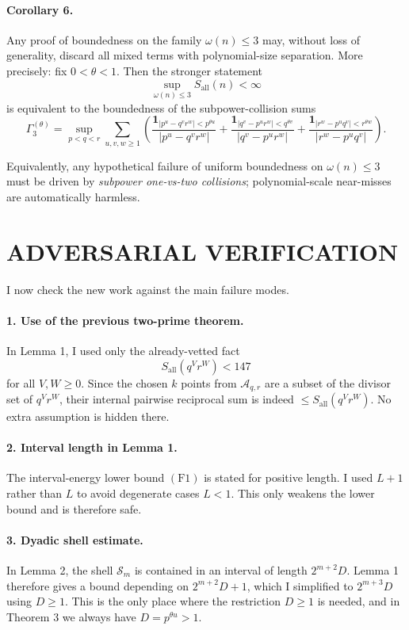 \paragraph{Corollary 6.}
Any proof of boundedness on the family \(\omega(n)\le 3\) may, without loss of generality, discard all mixed terms with polynomial-size separation. More precisely: fix \(0<\theta<1\). Then the stronger statement
\[
\sup_{\omega(n)\le 3}S_{\mathrm{all}}(n)<\infty
\]
is equivalent to the boundedness of the subpower-collision sums
\[
\Gamma_3^{(\theta)}
=
\sup_{p<q<r}
\sum_{u,v,w\ge 1}
\left(
\frac{\mathbf 1_{|p^u-q^v r^w|<p^{\theta u}}}{|p^u-q^v r^w|}
+
\frac{\mathbf 1_{|q^v-p^u r^w|<q^{\theta v}}}{|q^v-p^u r^w|}
+
\frac{\mathbf 1_{|r^w-p^u q^v|<r^{\theta w}}}{|r^w-p^u q^v|}
\right).
\]

Equivalently, any hypothetical failure of uniform boundedness on \(\omega(n)\le 3\) must be driven by \emph{subpower one-vs-two collisions}; polynomial-scale near-misses are automatically harmless.

\section{ADVERSARIAL VERIFICATION}

I now check the new work against the main failure modes.

\paragraph{1. Use of the previous two-prime theorem.}
In Lemma 1, I used only the already-vetted fact
\[
S_{\mathrm{all}}(q^V r^W)<147
\]
for all \(V,W\ge 0\). Since the chosen \(k\) points from \(\mathcal A_{q,r}\) are a subset of the divisor set of \(q^V r^W\), their internal pairwise reciprocal sum is indeed \(\le S_{\mathrm{all}}(q^V r^W)\). No extra assumption is hidden there.

\paragraph{2. Interval length in Lemma 1.}
The interval-energy lower bound \((\mathrm{F1})\) is stated for positive length. I used \(L+1\) rather than \(L\) to avoid degenerate cases \(L<1\). This only weakens the lower bound and is therefore safe.

\paragraph{3. Dyadic shell estimate.}
In Lemma 2, the shell \(\mathcal S_m\) is contained in an interval of length \(2^{m+2}D\). Lemma 1 therefore gives a bound depending on \(2^{m+2}D+1\), which I simplified to \(2^{m+3}D\) using \(D\ge 1\). This is the only place where the restriction \(D\ge 1\) is needed, and in Theorem 3 we always have \(D=p^{\theta u}>1\).

